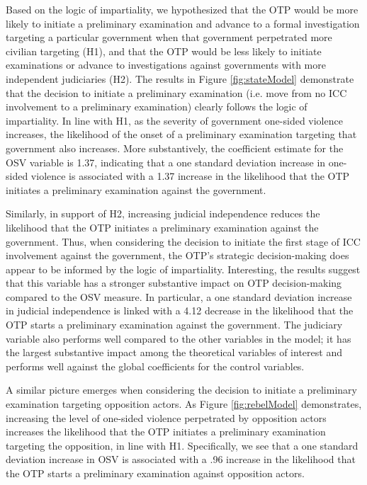 Based on the logic of impartiality, we hypothesized that the OTP would be more likely to initiate a preliminary examination and advance to a formal investigation targeting a particular government when that government perpetrated more civilian targeting (H1), and that the OTP would be less likely to initiate examinations or advance to investigations against governments with more independent judiciaries (H2). The results in Figure \ref{fig:stateModel} demonstrate that the decision to initiate a preliminary examination (i.e. move from no ICC involvement to a preliminary examination) clearly follows the logic of impartiality. In line with H1, as the severity of government one-sided violence increases, the likelihood of the onset of a preliminary examination targeting that government also increases.  More substantively, the coefficient estimate for the OSV variable is 1.37, indicating that a one standard deviation increase in one-sided violence is associated with a 1.37 increase in the likelihood that the OTP initiates a preliminary examination against the government.

Similarly, in support of H2, increasing judicial independence reduces the likelihood that the OTP initiates a preliminary examination against the government. Thus, when considering the decision to initiate the first stage of ICC involvement against the government, the OTP's strategic decision-making does appear to be informed by the logic of impartiality. Interesting, the results suggest that this variable has a stronger substantive impact on OTP decision-making compared to the OSV measure. In particular, a one standard deviation increase in judicial independence is linked with a 4.12 decrease in the likelihood that the OTP starts a preliminary examination against the government. The judiciary variable also performs well compared to the other variables in the model; it has the largest substantive impact among the theoretical variables of interest and performs well against the global coefficients for the control variables.

A similar picture emerges when considering the decision to initiate a preliminary examination targeting opposition actors. As Figure \ref{fig:rebelModel} demonstrates, increasing the level of one-sided violence perpetrated by opposition actors increases the likelihood that the OTP initiates a preliminary examination targeting the opposition, in line with H1. Specifically, we see that a one standard deviation increase in OSV is associated with a .96 increase in the likelihood that the OTP starts a preliminary examination against opposition actors.

